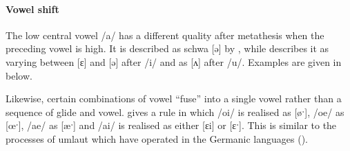 \begin{exe}
	\label{KwaVseq1}
\end{exe}

\paragraph{Vowel shift}\label{sec:KwaVoShi}
The low central vowel /a/ has a different quality
after metathesis when the preceding vowel is high.
It is described as schwa [ə] by \citet[315]{so80},
while \citet[23]{he04} describes it as varying between
[ɛ] and [ə] after /i/ and as [ʌ] after /u/.
Examples are given in  below.

\begin{exe}
	\label{Kw2}
\end{exe}

Likewise, certain combinations of vowel ``fuse'' into
a single vowel rather than a sequence of glide and vowel.
\citet[316]{so80} gives a rule in which /oi/ is realised as [øˑ],
/oe/ as [œˑ], /ae/ as [æˑ] and /ai/ is realised as either [ɛi] or [ɛˑ].
This is similar to the processes of umlaut which have
operated in the Germanic languages ().


\begin{exe}
	\label{KwVfusionS}
\end{exe}

